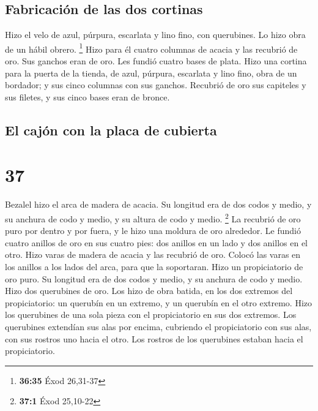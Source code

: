 \hypertarget{fabricaciuxf3n-de-las-dos-cortinas}{%
\subsection{Fabricación de las dos
cortinas}\label{fabricaciuxf3n-de-las-dos-cortinas}}

 Hizo el velo de azul, púrpura, escarlata y lino fino,
con querubines. Lo hizo obra de un hábil obrero. \footnote{\textbf{36:35}
  Éxod 26,31-37}  Hizo para él cuatro columnas de acacia
y las recubrió de oro. Sus ganchos eran de oro. Les fundió cuatro bases
de plata.  Hizo una cortina para la puerta de la tienda,
de azul, púrpura, escarlata y lino fino, obra de un bordador;
 y sus cinco columnas con sus ganchos. Recubrió de oro
sus capiteles y sus filetes, y sus cinco bases eran de bronce.

\hypertarget{el-cajuxf3n-con-la-placa-de-cubierta}{%
\subsection{El cajón con la placa de
cubierta}\label{el-cajuxf3n-con-la-placa-de-cubierta}}

\hypertarget{section-36}{%
\section{37}\label{section-36}}

 Bezalel hizo el arca de madera de acacia. Su longitud era
de dos codos y medio, y su anchura de codo y medio, y su altura de codo
y medio. \footnote{\textbf{37:1} Éxod 25,10-22}  La
recubrió de oro puro por dentro y por fuera, y le hizo una moldura de
oro alrededor.  Le fundió cuatro anillos de oro en sus
cuatro pies: dos anillos en un lado y dos anillos en el otro.
 Hizo varas de madera de acacia y las recubrió de oro.
 Colocó las varas en los anillos a los lados del arca,
para que la soportaran.  Hizo un propiciatorio de oro
puro. Su longitud era de dos codos y medio, y su anchura de codo y
medio.  Hizo dos querubines de oro. Los hizo de obra
batida, en los dos extremos del propiciatorio:  un
querubín en un extremo, y un querubín en el otro extremo. Hizo los
querubines de una sola pieza con el propiciatorio en sus dos extremos.
 Los querubines extendían sus alas por encima, cubriendo
el propiciatorio con sus alas, con sus rostros uno hacia el otro. Los
rostros de los querubines estaban hacia el propiciatorio.

